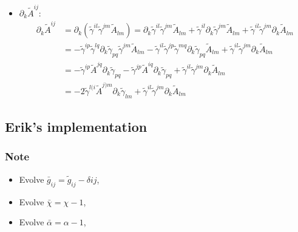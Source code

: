 \documentclass[prd,aps,a4paper,superscriptaddress,onecolumn,footinbib]{revtex4}
\begin{document}
\begin{itemize}
\item $\partial_k\tilde{A}^{ij}$:
  \begin{align}
    \partial_k\tilde{A}^{ij}
    &=\partial_k
    \left(
      \tilde\gamma^{il}\tilde\gamma^{jm}\tilde{A}_{lm}
    \right)
    =
    \partial_k\tilde\gamma^{il}\tilde\gamma^{jm}\tilde{A}_{lm}+
    \tilde\gamma^{il}\partial_k\tilde\gamma^{jm}\tilde{A}_{lm}+
    \tilde\gamma^{il}\tilde\gamma^{jm}\partial_k\tilde{A}_{lm}
    \\
    &=
    -\tilde\gamma^{ip}\tilde\gamma^{lq}\partial_k\tilde\gamma_{pq}\tilde\gamma^{jm}\tilde{A}_{lm}
    -\tilde\gamma^{il}\tilde\gamma^{jp}\tilde\gamma^{mq}\partial_k\tilde\gamma_{pq}\tilde{A}_{lm}
    +\tilde\gamma^{il}\tilde\gamma^{jm}\partial_k\tilde{A}_{lm}
    \\
    &=
    -\tilde\gamma^{ip}\tilde{A}^{jq}\partial_k\tilde\gamma_{pq}
    -\tilde\gamma^{jp}\tilde{A}^{iq}\partial_k\tilde\gamma_{pq}
    +\tilde\gamma^{il}\tilde\gamma^{jm}\partial_k\tilde{A}_{lm}
    \\
    &=
    -2\tilde\gamma^{l(i}\tilde{A}^{j)m}\partial_k\tilde\gamma_{lm}
    +\tilde\gamma^{il}\tilde\gamma^{jm}\partial_k\tilde{A}_{lm}
  \end{align}
\end{itemize}

\subsection{Erik's implementation}

\subsubsection{Note}
\begin{itemize}
\item Evolve $\bar{g}_{ij}=\tilde{g}_{ij}-\delta{ij}$,
\item Evolve $\bar{\chi}=\chi-1$,
\item Evolve $\bar{\alpha}=\alpha-1$,
\end{itemize}
\end{document}
